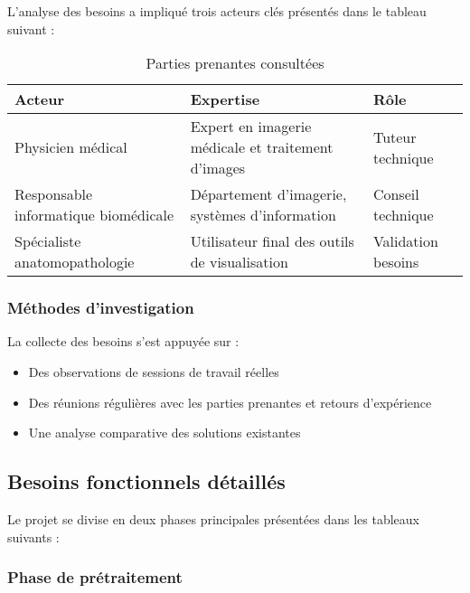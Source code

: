 \documentclass[12pt,a4paper]{report}
\begin{document}
L'analyse des besoins a impliqué trois acteurs clés présentés dans le tableau suivant :

\begin{table}[H]
\centering
\begin{tabular}{|p{4cm}|p{8cm}|p{3cm}|}
\hline
\rowcolor{TableHeaderColor}
\textbf{Acteur} & \textbf{Expertise} & \textbf{Rôle} \\
\hline
Physicien médical & Expert en imagerie médicale et traitement d'images & Tuteur technique \\
\hline
Responsable informatique biomédicale & Département d'imagerie, systèmes d'information & Conseil technique \\
\hline
Spécialiste anatomopathologie & Utilisateur final des outils de visualisation & Validation besoins \\
\hline
\end{tabular}
\caption{Parties prenantes consultées}
\end{table}

\subsubsection{Méthodes d'investigation}

La collecte des besoins s'est appuyée sur :
\begin{itemize}
\item Des observations de sessions de travail réelles
\item Des réunions régulières avec les parties prenantes et retours d'expérience
\item Une analyse comparative des solutions existantes
\end{itemize}

\subsection{Besoins fonctionnels détaillés}

Le projet se divise en deux phases principales présentées dans les tableaux suivants :

\subsubsection{Phase de prétraitement}
\end{document}
